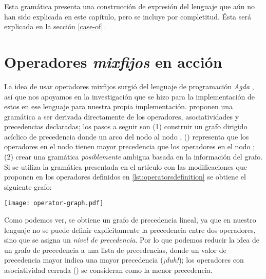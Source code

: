 {\begin{implementationfr}
Esta gramática presenta una construcción de expresión  del lenguaje que aún no han sido explicada en este capítulo, pero se incluye por completitud. Ésta será explicada en la sección \ref{case-of}.

\end{implementationfr}

\section{Operadores \emph{mixfijos} en acción}

\begin{investigationfr}
La idea de usar operadores mixfijos surgió del lenguaje de programación \emph{Agda} \cite{agda}, así que nos apoyamos en la investigación que se hizo para la implementación de estos en ese lenguaje para nuestra propia implementación. \textcite{parsing-mixfix-operators} proponen una gramática a ser derivada directamente de los operadores, asociatividades y precedencias declaradas; los pasos a seguir son (1) construir un grafo dirigido acíclico de precedencia donde un arco del nodo  al nodo , () representa que los operadores en el nodo  tienen mayor precedencia que los operadores en el nodo ; (2) crear una gramática \emph{posiblemente} ambigua basada en la información del grafo. Si se utiliza la gramática presentada en el artículo con las modificaciones que proponen en los operadores definidos en \ref{lst:operatorsdefinition} se obtiene el siguiente grafo:

\begin{center}
\texttt{[image: operator-graph.pdf]}
\label{fig:operator-graph}
\end{center}

Como podemos ver, se obtiene un grafo de precedencia lineal, ya que en nuestro lenguaje no se puede definir explícitamente la precedencia entre dos operadores, sino que se asigna un \emph{nivel de precedencia}. Por lo que podemos reducir la idea de un grafo de precedencia a una lista de precedencias, donde un valor de precedencia mayor indica una mayor precedencia (\emph{¡duh!}); los operadores con asociatividad cerrada () se consideran como la menor precedencia.

{   %
\newcommand{\overp}[1]{\overset{#1}{p}}
\renewcommand{\emph}[1]{\textbf{\textit{#1}}}
\renewcommand{\_}{\:\:}

}
\end{investigationfr}}
